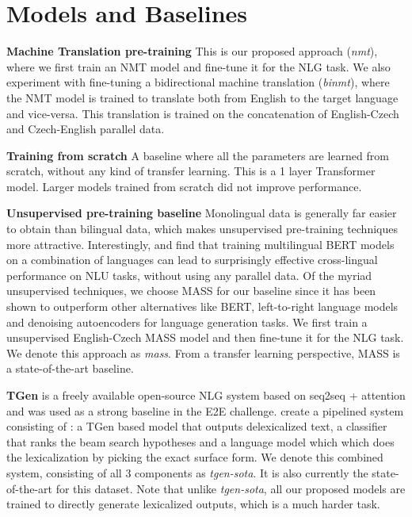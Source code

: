 \documentclass[11pt,a4paper]{article}
\begin{document}
\section{Models and Baselines} \label{baselines}
\textbf{Machine Translation pre-training} This is our proposed approach (\textsl{nmt}), where we first train an NMT model and fine-tune it for the NLG task. We also experiment with fine-tuning a bidirectional machine translation (\textsl{binmt}), where the NMT model is trained to translate both from English to the target language and vice-versa. This translation is trained on the concatenation of English-Czech and Czech-English parallel data. \par
\textbf{Training from scratch} A baseline where all the parameters are learned from scratch, without any kind of transfer learning. This is a 1 layer Transformer model. Larger models trained from scratch did not improve performance. \par
\textbf{Unsupervised pre-training baseline} Monolingual data is generally far easier to obtain than bilingual data, which makes unsupervised pre-training techniques more attractive. Interestingly, \citet{wu2019beto} and \citet{pires2019multilingual} find that training multilingual BERT models on a combination of languages can lead to surprisingly effective cross-lingual performance on NLU tasks, without using any parallel data. Of the myriad unsupervised techniques, we choose MASS \citep{song2019mass} for our baseline since it has been shown to outperform other alternatives like BERT, left-to-right language models and denoising autoencoders for language generation tasks. We first train a unsupervised English-Czech MASS model and then fine-tune it for the NLG task. We denote this approach as  \textsl{mass}. From a transfer learning perspective, MASS is a state-of-the-art baseline. \par
\textbf{TGen} is a freely available open-source NLG system based on seq2seq + attention and was used as a strong baseline in the E2E challenge. \citet{duvsek2019neural} create a pipelined system consisting of : a TGen based model that outputs delexicalized text, a classifier that ranks the beam search hypotheses and a language model which which does the lexicalization by picking the exact surface form. We denote this combined system, consisting of all 3 components as \textsl{tgen-sota}. It is also currently the state-of-the-art for this dataset. Note that unlike \textsl{tgen-sota}, all our proposed models are trained to directly generate lexicalized outputs, which is a much harder task.
\end{document}
